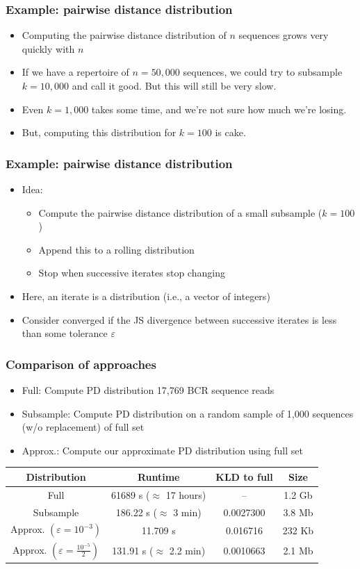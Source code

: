 \documentclass[mathserif,compress]{beamer}
\newcommand*\eps{\epsilon}
\renewcommand\;{\,}
\renewcommand\epsilon{\varepsilon}
\begin{document}
\begin{frame}\frametitle{Example: pairwise distance distribution}
\begin{itemize}
\item
Computing the pairwise distance distribution of $n$ sequences grows very quickly with $n$
\bigskip
\item
If we have a repertoire of $n = 50,000$ sequences, we could try to subsample $k = 10,000$ and call it good. But this will still be very slow. 
\bigskip
\item
Even $k = 1,000$ takes some time, and we're not sure how much we're losing.

\bigskip
\item But, computing this distribution for $k = 100$ is cake. 
\end{itemize}
\end{frame}

\begin{frame}\frametitle{Example: pairwise distance distribution}
\begin{itemize}
\item Idea:
\begin{itemize}
\item
Compute the pairwise distance distribution of a small subsample ($k = 100$)
\item
Append this to a rolling distribution
\item
Stop when successive iterates stop changing
\end{itemize}
\bigskip
\item
Here, an iterate is a distribution (i.e., a vector of integers)
\bigskip
\item
Consider converged if the JS divergence between successive iterates is less than some tolerance $\eps$
\end{itemize}
\end{frame}

\begin{frame}\frametitle{Comparison of approaches}
\begin{center}
\begin{itemize}
\item Full: Compute PD distribution 17,769 BCR sequence reads
\item Subsample: Compute PD distribution on a random sample of 1,000 sequences (w/o replacement) of full set
\item Approx.: Compute our approximate PD distribution using full set
\end{itemize}
\bigskip
\begin{tabular}{c|c|c|c}
Distribution & Runtime & KLD to full & Size \\
\hline
Full & 61689 s ($\approx$ 17 hours) &  -- & 1.2 Gb \\
Subsample & 186.22 s ($\approx$ 3 min) & 0.0027300 & 3.8 Mb \\
Approx. $\left(\eps = 10^{-3}\right)$ & 11.709 s & 0.016716 & 232 Kb\\
Approx. $\left(\eps = \frac{10^{-5}}{2}\right)$ & 131.91 s ($\approx$ 2.2 min) & 0.0010663 & 2.1 Mb
\end{tabular}
\end{center}
\end{frame}
\end{document}
